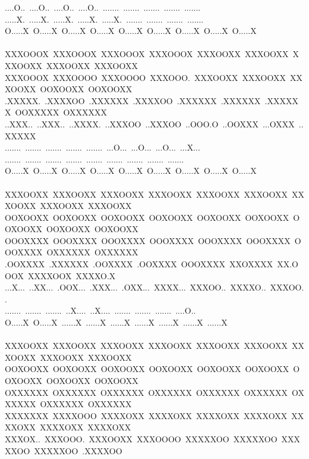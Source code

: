 \documentclass[12pt]{article}
\begin{document}
\begin{center}
{....O..~....O..~....O..~....O..~.......~.......~.......~.......~.......~\\
.....X.~.....X.~.....X.~.....X.~.....X.~.......~.......~.......~.......~\\
O.....X~O.....X~O.....X~O.....X~O.....X~O.....X~O.....X~O.....X~O.....X~\\
~\\%
XXXOOOX~XXXOOOX~XXXOOOX~XXXOOOX~XXXOOXX~XXXOOXX~XXXOOXX~XXXOOXX~XXXOOXX~\\
XXXOOOX~XXXOOOO~XXXOOOO~XXXOOO.~XXXOOXX~XXXOOXX~XXXOOXX~OOXOOXX~OOXOOXX~\\
.XXXXX.~.XXXXOO~.XXXXXX~.XXXXOO~.XXXXXX~.XXXXXX~.XXXXXX~OOXXXXX~OXXXXXX~\\
..XXX..~..XXX..~..XXXX.~..XXXOO~..XXXOO~..OOO.O~..OOXXX~...OXXX~..XXXXX~\\
.......~.......~.......~.......~.......~...O...~...O...~...O...~...X...~\\
.......~.......~.......~.......~.......~.......~.......~.......~.......~\\
O.....X~O.....X~O.....X~O.....X~O.....X~O.....X~O.....X~O.....X~O.....X~\\
~\\
XXXOOXX~XXXOOXX~XXXOOXX~XXXOOXX~XXXOOXX~XXXOOXX~XXXOOXX~XXXOOXX~XXXOOXX~\\
OOXOOXX~OOXOOXX~OOXOOXX~OOXOOXX~OOXOOXX~OOXOOXX~OOXOOXX~OOXOOXX~OOXOOXX~\\
OOOXXXX~OOOXXXX~OOOXXXX~OOOXXXX~OOOXXXX~OOOXXXX~OOOXXXX~OXXXXXX~OXXXXXX~\\
.OOXXXX~.XXXXXX~.OOXXXX~.OOXXXX~OOOXXXX~XXOXXXX~XX.OOOX~XXXXOOX~XXXXO.X~\\
...X...~..XX...~.OOX...~.XXX...~.OXX...~XXXX...~XXXOO..~XXXXO..~XXXOO..~\\
.......~.......~.......~..X....~..X....~.......~.......~.......~....O..~\\
O.....X~O.....X~......X~......X~......X~......X~......X~......X~......X~\\
~\\\pagebreak
XXXOOXX~XXXOOXX~XXXOOXX~XXXOOXX~XXXOOXX~XXXOOXX~XXXOOXX~XXXOOXX~XXXOOXX~\\
OOXOOXX~OOXOOXX~OOXOOXX~OOXOOXX~OOXOOXX~OOXOOXX~OOXOOXX~OOXOOXX~OOXOOXX~\\
OXXXXXX~OXXXXXX~OXXXXXX~OXXXXXX~OXXXXXX~OXXXXXX~OXXXXXX~OXXXXXX~OXXXXXX~\\
XXXXXXX~XXXXOOO~XXXXOXX~XXXXOXX~XXXXOXX~XXXXOXX~XXXXOXX~XXXXOXX~XXXXOXX~\\
XXXOX..~XXXOOO.~XXXOOXX~XXXOOOO~XXXXXOO~XXXXXOO~XXXXXOO~XXXXXOO~.XXXXOO~\\
}
\end{center}
\end{document}
